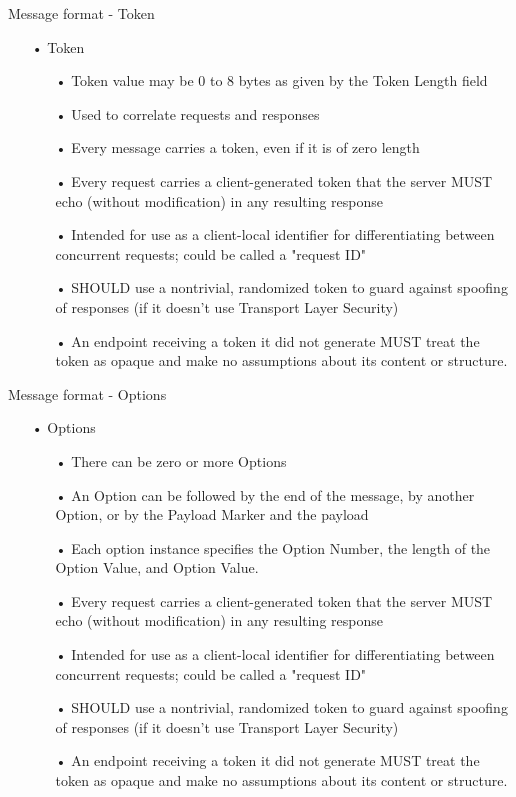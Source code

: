 \documentclass[11pt]{beamer}
\begin{document}
\begin{frame}{Message format - Token}
\begin{itemize}
\item[•] Token
\begin{itemize}
\item[•] Token value may be 0 to 8 bytes as given by the Token Length field
\item[•] Used to correlate requests and responses
\item[•] Every message carries a token, even if it is of zero length
\item[•] Every request carries a client-generated token that the server MUST echo (without modification) in any resulting response
\item[•] Intended for use as a client-local identifier for differentiating between concurrent requests; could be called a "request ID"
\item[•] SHOULD use a nontrivial, randomized token to guard against spoofing of responses (if it doesn't use Transport Layer Security)
\item[•] An endpoint receiving a token it did not generate MUST treat the token as opaque and make no assumptions about its content or structure.
\end{itemize}
\end{itemize}
\end{frame}
\begin{frame}{Message format - Options}
\begin{itemize}
\item[•] Options
\begin{itemize}
\item[•] There can be zero or more Options
\item[•] An Option can be followed by the end of the message, by another Option, or by the Payload Marker and the payload
\item[•] Each option instance specifies the Option Number, the length of the Option Value, and Option Value.
\item[•] Every request carries a client-generated token that the server MUST echo (without modification) in any resulting response
\item[•] Intended for use as a client-local identifier for differentiating between concurrent requests; could be called a "request ID"
\item[•] SHOULD use a nontrivial, randomized token to guard against spoofing of responses (if it doesn't use Transport Layer Security)
\item[•] An endpoint receiving a token it did not generate MUST treat the token as opaque and make no assumptions about its content or structure.
\end{itemize}
\end{itemize}
\end{frame}
\end{document}
